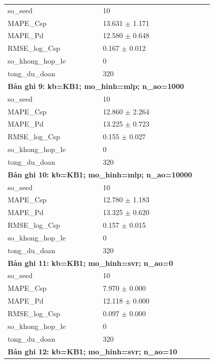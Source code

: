 \begin{longtable}{p{0.43\linewidth}p{0.50\linewidth}}
so\_\allowbreak seed & 10 \\
MAPE\_\allowbreak Csp & 13.631 $\pm$ 1.171 \\
MAPE\_\allowbreak Pd & 12.580 $\pm$ 0.648 \\
RMSE\_\allowbreak log\_\allowbreak Csp & 0.167 $\pm$ 0.012 \\
so\_\allowbreak khong\_\allowbreak hop\_\allowbreak le & 0 \\
tong\_\allowbreak du\_\allowbreak doan & 320 \\
\midrule
\multicolumn{2}{p{0.95\linewidth}}{\textbf{Bản ghi 9: kb=KB1; mo\_hinh=mlp; n\_ao=1000}} \\
so\_\allowbreak seed & 10 \\
MAPE\_\allowbreak Csp & 12.860 $\pm$ 2.264 \\
MAPE\_\allowbreak Pd & 13.225 $\pm$ 0.723 \\
RMSE\_\allowbreak log\_\allowbreak Csp & 0.155 $\pm$ 0.027 \\
so\_\allowbreak khong\_\allowbreak hop\_\allowbreak le & 0 \\
tong\_\allowbreak du\_\allowbreak doan & 320 \\
\midrule
\multicolumn{2}{p{0.95\linewidth}}{\textbf{Bản ghi 10: kb=KB1; mo\_hinh=mlp; n\_ao=10000}} \\
so\_\allowbreak seed & 10 \\
MAPE\_\allowbreak Csp & 12.780 $\pm$ 1.183 \\
MAPE\_\allowbreak Pd & 13.325 $\pm$ 0.620 \\
RMSE\_\allowbreak log\_\allowbreak Csp & 0.157 $\pm$ 0.015 \\
so\_\allowbreak khong\_\allowbreak hop\_\allowbreak le & 0 \\
tong\_\allowbreak du\_\allowbreak doan & 320 \\
\midrule
\multicolumn{2}{p{0.95\linewidth}}{\textbf{Bản ghi 11: kb=KB1; mo\_hinh=svr; n\_ao=0}} \\
so\_\allowbreak seed & 10 \\
MAPE\_\allowbreak Csp & 7.970 $\pm$ 0.000 \\
MAPE\_\allowbreak Pd & 12.118 $\pm$ 0.000 \\
RMSE\_\allowbreak log\_\allowbreak Csp & 0.097 $\pm$ 0.000 \\
so\_\allowbreak khong\_\allowbreak hop\_\allowbreak le & 0 \\
tong\_\allowbreak du\_\allowbreak doan & 320 \\
\midrule
\multicolumn{2}{p{0.95\linewidth}}{\textbf{Bản ghi 12: kb=KB1; mo\_hinh=svr; n\_ao=10}} \\

\end{longtable}
